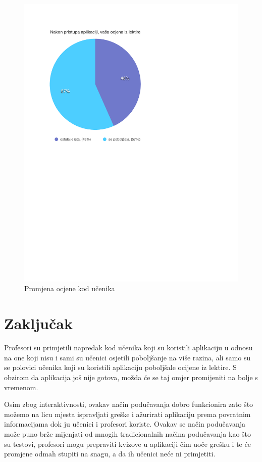 \documentclass[11pt]{scrreprt}
\begin{document}
\begin{figure}[H]
  \includegraphics[width=\textwidth, clip=true, trim=0 2.5cm 0 0]{student/grades}
  \caption{Promjena ocjene kod učenika}
  \label{fig:student/grades}
\end{figure}

\chapter{Zaključak}

Profesori su primjetili napredak kod učenika koji su koristili aplikaciju u
odnosu na one koji nisu i sami su učenici osjetili poboljšanje na više razina,
ali samo su se polovici učenika koji su koristili aplikaciju poboljšale ocijene
iz lektire. S obzirom da aplikacija još nije gotova, možda će se taj omjer
promijeniti na bolje s vremenom.

Osim zbog interaktivnosti, ovakav način podučavanja dobro funkcionira zato što
možemo na licu mjesta ispravljati greške i ažurirati aplikaciju prema povratnim
informacijama dok ju učenici i profesori koriste. Ovakav se način podučavanja
može puno brže mijenjati od mnogih tradicionalnih načina podučavanja kao što su
testovi, profesori mogu prepraviti kvizove u aplikaciji čim uoče grešku i te će
promjene odmah stupiti na snagu, a da ih učenici neće ni primjetiti.
\end{document}
